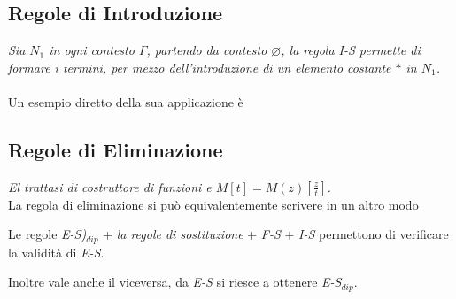 \documentclass[10pt,a4paper, italian]{book}
\begin{document}
{{\subsection{Regole di Introduzione}
\label{subsec:introduzione}
\begin{prooftree}
\end{prooftree}
\textit{Sia $N_1$ in ogni contesto $\Gamma$, partendo da contesto $\varnothing$, la regola I-S permette di formare i termini, per mezzo dell'introduzione di un elemento costante $\ast$ in $N_1$.}\\\\
Un esempio diretto della sua applicazione \`e
\begin{prooftree}
\end{prooftree}

\subsection{Regole di Eliminazione}
\label{subsec:eliminazione}
\begin{prooftree}
\end{prooftree}
\noindent
\textit{El trattasi di costruttore di funzioni e $M[t] = M(z)[\frac{z}{t}]$.}
\\
La regola di eliminazione si pu\`o equivalentemente scrivere in un altro modo
\begin{prooftree}
\end{prooftree}
Le regole \textit{E-S)$_{dip}$} + \textit{la regole di sostituzione} + \textit{F-S} + \textit{I-S} permettono di verificare la validit\`a di \textit{E-S}.
\begin{prooftree}
\end{prooftree}
\noindent
Inoltre vale anche il viceversa, da \textit{E-S} si riesce a ottenere \textit{E-S$_{dip}$}.
}}
\end{document}
